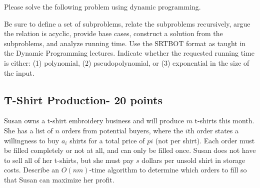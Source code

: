 \documentclass[12pt]{amsart}
\begin{document}
\begin{bf} Please solve the following problem using dynamic programming.\end{bf} Be sure to define a set of subproblems, relate the subproblems recursively, argue the relation is acyclic, provide base cases, construct a solution from the subproblems, and analyze running time. Use the SRTBOT format as taught in the Dynamic Programming lectures. Indicate whether the requested running time is either: (1) polynomial, (2) pseudopolynomial, or (3) exponential in the size of the input. 

\subsection{T-Shirt Production- 20 points} 
Susan owns a t-shirt embroidery business and will produce $m$ t-shirts this month. She has a list of $n$
orders from potential buyers, where the $i$th order states a willingness to buy $a_i$ shirts for a total
price of $pi$ (not per shirt). Each order must be filled completely or not at all, and can only be filled once. Susan does not have to sell all of her t-shirts, but she must pay $s$ dollars
per unsold shirt in storage costs. Describe an $O(nm)$-time algorithm to determine which orders
to fill so that Susan can maximize her profit.  
\\
\end{document}
